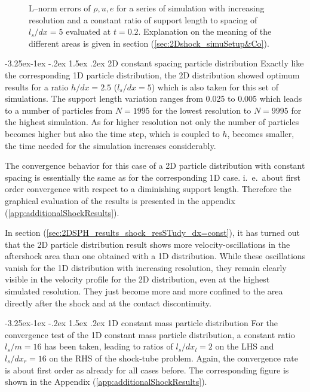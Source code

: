 \documentclass[11pt,a4paper,twoside]{report}
\makeatletter
\renewcommand\paragraph{\@startsection{paragraph}{4}{\z@}%
  {-3.25ex\@plus -1ex \@minus -.2ex}%
  {1.5ex \@plus .2ex}%
  {\normalfont\normalsize\bfseries}}
\makeatother
\begin{document}
\begin{figure}[H]
\caption[Convergence Shock-tube 1D constant spacing particle distribution]{L--norm errors of $\rho, u, e$ for a series of simulation with increasing resolution and a constant ratio of support length to spacing of $l_s/dx=5$ evaluated at $t=0.2$. Explanation on the meaning of the different areas is given in section (\ref{sec:2Dshock_simuSetup&Co}).}

\end{figure}

\paragraph{2D constant spacing particle distribution}
Exactly like the corresponding 1D particle distribution, the 2D distribution showed optimum results for a ratio $h/dx=2.5$ ($l_s/dx=5$) which is also taken for this set of simulations. The support length variation ranges from 0.025 to 0.005 which leads to a number of particles from $N=1995$ for the lowest resolution to $N=9995$ for the highest simulation. As for higher resolution not only the number of particles becomes higher but also the time step, which is coupled to $h$, becomes smaller, the time needed for the simulation increases considerably. %

The convergence behavior for this case of a 2D particle distribution with constant spacing is essentially the same as for the corresponding 1D case. i.\ e.\ about first order convergence with respect to a diminishing support length. Therefore the graphical evaluation of the results is presented in the appendix (\ref{app:additionalShockResults}).

In section (\ref{sec:2DSPH_results_shock_resSTudy_dx=const}), it has turned out that the 2D particle distribution result shows more velocity-oscillations in the aftershock area than one obtained with a 1D distribution. While these oscillations vanish for the 1D distribution with increasing resolution, they remain clearly visible in the velocity profile for the 2D distribution, even at the highest simulated resolution. They just become more and more confined to the area directly after the shock and at the contact discontinuity. 

 
\paragraph{1D constant mass particle distribution}
For the convergence test of the 1D constant mass particle distribution, a constant ratio $l_s/m=16$ has been taken, leading to ratios of $l_s/dx_l=2$ on the LHS and $l_s/dx_r=16$ on the RHS of the shock-tube problem. Again, the convergence rate is about first order as already for all cases before. The corresponding figure is shown in the Appendix (\ref{app:additionalShockResults}). 
\end{document}
